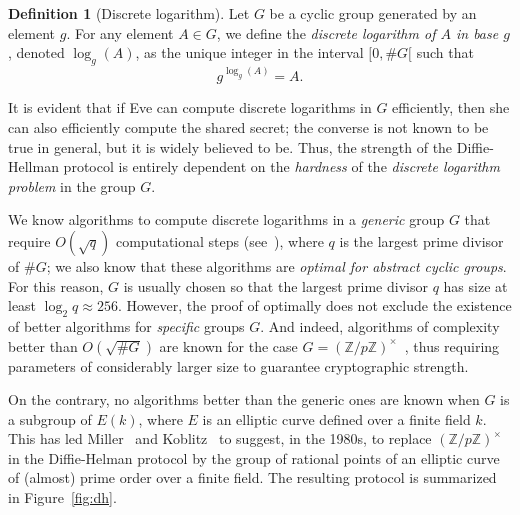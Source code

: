 \documentclass[10pt]{article}
\theoremstyle{plain}
\theoremstyle{definition}
\newtheorem{definition}[theorem]{Definition}
\begin{document}
\begin{definition}[Discrete logarithm]
  Let $G$ be a cyclic group generated by an element $g$. For any
  element $A∈G$, we define the \emph{discrete logarithm of $A$ in base
    $g$}, denoted $\log_g(A)$, as the unique integer in the interval
  $[0,\#G[$ such that
  \[g^{\log_g(A)} = A.\]
\end{definition}

It is evident that if Eve can compute discrete logarithms in $G$
efficiently, then she can also efficiently compute the shared secret;
the converse is not known to be true in general, but it is widely
believed to be. %
Thus, the strength of the Diffie-Hellman protocol is entirely
dependent on the \emph{hardness} of the \emph{discrete logarithm
  problem} in the group $G$.

We know algorithms to compute discrete logarithms in a \emph{generic}
group $G$ that require $O(\sqrt{q})$ computational steps
(see~\cite{joux2009algorithmic}), where $q$ is the largest prime
divisor of $\#G$; we also know that these algorithms are \emph{optimal
  for abstract cyclic groups}. %
For this reason, $G$ is usually chosen so that the largest prime
divisor $q$ has size at least $\log_2 q ≈ 256$. %
However, the proof of optimally does not exclude the existence of
better algorithms for \emph{specific} groups $G$. %
And indeed, algorithms of complexity better than $O(\sqrt{\#G})$ are
known for the case $G=(ℤ/pℤ)^{×}$~\cite{joux2009algorithmic}, thus
requiring parameters of considerably larger size to guarantee
cryptographic strength.

On the contrary, no algorithms better than the generic ones are known
when $G$ is a subgroup of $E(k)$, where $E$ is an elliptic curve
defined over a finite field $k$. %
This has led Miller~\cite{miller86} and Koblitz~\cite{koblitz87} to
suggest, in the 1980s, to replace $(ℤ/pℤ)^{×}$ in the Diffie-Helman
protocol by the group of rational points of an elliptic curve of
(almost) prime order over a finite field. %
The resulting protocol is summarized in Figure~\ref{fig:dh}.
\end{document}
